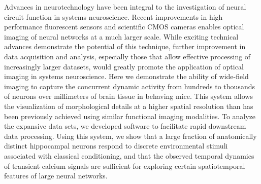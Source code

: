 Advances in neurotechnology have been integral to the investigation of neural circuit function in systems neuroscience. Recent improvements in high performance fluorescent sensors and scientific CMOS cameras enables optical imaging of neural networks at a much larger scale. While exciting technical advances demonstrate the potential of this technique, further improvement in data acquisition and analysis, especially those that allow effective processing of increasingly larger datasets, would greatly promote the application of optical imaging in systems neuroscience. Here we demonstrate the ability of wide-field imaging to capture the concurrent dynamic activity from hundreds to thousands of neurons over millimeters of brain tissue in behaving mice. This system allows the visualization of morphological details at a higher spatial resolution than has been previously achieved using similar functional imaging modalities. To analyze the expansive data sets, we developed software to facilitate rapid downstream data processing. Using this system, we show that a large fraction of anatomically distinct hippocampal neurons respond to discrete environmental stimuli associated with classical conditioning, and that the observed temporal dynamics of transient calcium signals are sufficient for exploring certain spatiotemporal features of large neural networks.
